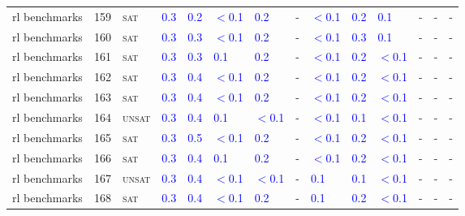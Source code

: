 \begin{center}
{\begin{longtable}{@{}llllllllllllll@{}}
rl benchmarks & 159 & \textsc{sat} & \textcolor{blue}{0.3} & \textcolor{blue}{0.2} & \textcolor{blue}{$<$0.1} & \textcolor{blue}{0.2} & - & \textcolor{blue}{$<$0.1} & \textcolor{blue}{0.2} & \textcolor{blue}{0.1} & - & - & - \\
rl benchmarks & 160 & \textsc{sat} & \textcolor{blue}{0.3} & \textcolor{blue}{0.3} & \textcolor{blue}{$<$0.1} & \textcolor{blue}{0.2} & - & \textcolor{blue}{$<$0.1} & \textcolor{blue}{0.3} & \textcolor{blue}{0.1} & - & - & - \\
rl benchmarks & 161 & \textsc{sat} & \textcolor{blue}{0.3} & \textcolor{blue}{0.3} & \textcolor{blue}{0.1} & \textcolor{blue}{0.2} & - & \textcolor{blue}{$<$0.1} & \textcolor{blue}{0.2} & \textcolor{blue}{$<$0.1} & - & - & - \\
rl benchmarks & 162 & \textsc{sat} & \textcolor{blue}{0.3} & \textcolor{blue}{0.4} & \textcolor{blue}{$<$0.1} & \textcolor{blue}{0.2} & - & \textcolor{blue}{$<$0.1} & \textcolor{blue}{0.2} & \textcolor{blue}{$<$0.1} & - & - & - \\
rl benchmarks & 163 & \textsc{sat} & \textcolor{blue}{0.3} & \textcolor{blue}{0.4} & \textcolor{blue}{$<$0.1} & \textcolor{blue}{0.2} & - & \textcolor{blue}{$<$0.1} & \textcolor{blue}{0.2} & \textcolor{blue}{$<$0.1} & - & - & - \\
rl benchmarks & 164 & \textsc{unsat} & \textcolor{blue}{0.3} & \textcolor{blue}{0.4} & \textcolor{blue}{0.1} & \textcolor{blue}{$<$0.1} & - & \textcolor{blue}{$<$0.1} & \textcolor{blue}{0.1} & \textcolor{blue}{$<$0.1} & - & - & - \\
rl benchmarks & 165 & \textsc{sat} & \textcolor{blue}{0.3} & \textcolor{blue}{0.5} & \textcolor{blue}{$<$0.1} & \textcolor{blue}{0.2} & - & \textcolor{blue}{$<$0.1} & \textcolor{blue}{0.2} & \textcolor{blue}{$<$0.1} & - & - & - \\
rl benchmarks & 166 & \textsc{sat} & \textcolor{blue}{0.3} & \textcolor{blue}{0.4} & \textcolor{blue}{0.1} & \textcolor{blue}{0.2} & - & \textcolor{blue}{$<$0.1} & \textcolor{blue}{0.2} & \textcolor{blue}{$<$0.1} & - & - & - \\
rl benchmarks & 167 & \textsc{unsat} & \textcolor{blue}{0.3} & \textcolor{blue}{0.4} & \textcolor{blue}{$<$0.1} & \textcolor{blue}{$<$0.1} & - & \textcolor{blue}{0.1} & \textcolor{blue}{0.1} & \textcolor{blue}{$<$0.1} & - & - & - \\
rl benchmarks & 168 & \textsc{sat} & \textcolor{blue}{0.3} & \textcolor{blue}{0.4} & \textcolor{blue}{$<$0.1} & \textcolor{blue}{0.2} & - & \textcolor{blue}{0.1} & \textcolor{blue}{0.2} & \textcolor{blue}{$<$0.1} & - & - & - \\

\end{longtable}}
\end{center}

